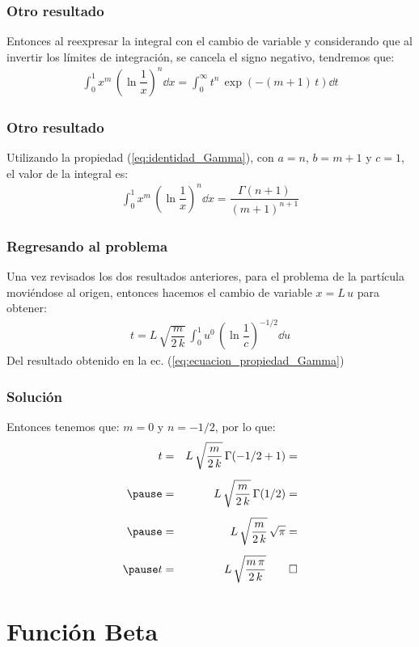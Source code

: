 \begin{frame}
\frametitle{Otro resultado}
Entonces al reexpresar la integral con el cambio de variable y considerando que al invertir los límites de integración, se cancela el signo negativo, tendremos que:
\begin{align*}
\int_{0}^{1} x^{m} \, \left( \ln \dfrac{1}{x} \right)^{n} \dd{x} = \int_{0}^{\infty} t^{n} \, \exp(-(m+1) \, t) \dd{t}
\end{align*}
\end{frame}
\begin{frame}
\frametitle{Otro resultado}
Utilizando la propiedad (\ref{eq:identidad_Gamma}), con $a = n$, $b = m + 1$ y $c = 1$, el valor de la integral es:
\begin{align}
\int_{0}^{1} x^{m} \, \left( \ln \dfrac{1}{x} \right)^{n} \dd{x} = \dfrac{\Gamma (n + 1)}{(m + 1)^{n+1}}
\label{eq:ecuacion_propiedad_Gamma}
\end{align}
\end{frame}
\begin{frame}
\frametitle{Regresando al problema}
Una vez revisados los dos resultados anteriores, para el problema de la partícula moviéndose al origen, entonces hacemos el cambio de variable $x = L \, u$ para obtener:
\begin{align*}
t = L \, \sqrt{\dfrac{m}{2 \, k}} \, \int_{0}^{1} u^{0} \, \left( \ln \dfrac{1}{c} \right)^{-1/2} \dd{u}
\end{align*}
\pause
Del resultado obtenido en la ec. (\ref{eq:ecuacion_propiedad_Gamma})
\end{frame}
\begin{frame}
\frametitle{Solución}
Entonces tenemos que: $m = 0$ y $n = -1/2$, por lo que:
\begin{eqnarray*}
t &=& L \, \sqrt{\dfrac{m}{2 \, k}} \, \Gamma(-1/2 + 1) = \\[0.5em] \pause
&=& L \, \sqrt{\dfrac{m}{2 \, k}} \, \Gamma(1/2) = \\[0.5em] \pause
&=& L \, \sqrt{\dfrac{m}{2 \, k}} \, \sqrt{\pi} = \\[0.5em] \pause
t &=& L \, \sqrt{\dfrac{m \, \pi}{2 \, k}} \qed
\end{eqnarray*}
\end{frame}
\section{Función Beta}
